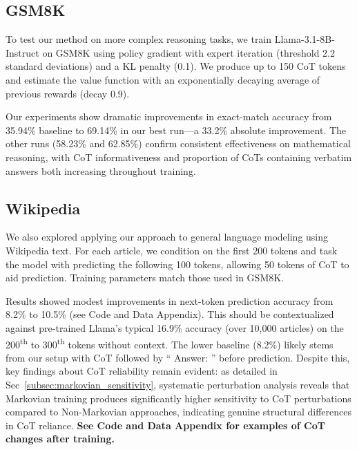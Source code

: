 \documentclass{article} %
\begin{document}
\subsection{GSM8K}
\label{subsec:gsm8k}
To test our method on more complex reasoning tasks, we train Llama-3.1-8B-Instruct on GSM8K using policy gradient with expert iteration (threshold 2.2 standard deviations) and a KL penalty (0.1). We produce up to 150 CoT tokens and estimate the value function with an exponentially decaying average of previous rewards (decay 0.9).

Our experiments show dramatic improvements in exact-match accuracy from 35.94\% baseline to 69.14\% in our best run—a 33.2\% absolute improvement. The other runs (58.23\% and 62.85\%) confirm consistent effectiveness on mathematical reasoning, with CoT informativeness and proportion of CoTs containing verbatim answers both increasing throughout training.

\subsection{Wikipedia}
\label{subsec:wikipedia}

We also explored applying our approach to general language modeling using Wikipedia text. For each article, we condition on the first 200 tokens and task the model with predicting the following 100 tokens, allowing 50 tokens of CoT to aid prediction. Training parameters match those used in GSM8K.

Results showed modest improvements in next-token prediction accuracy from 8.2\% to 10.5\% (see Code and Data Appendix). This should be contextualized against pre-trained Llama's typical 16.9\% accuracy (over 10,000 articles) on the 200\textsuperscript{th} to 300\textsuperscript{th} tokens without context. The lower baseline (8.2\%) likely stems from our setup with CoT followed by `` Answer: '' before prediction. Despite this, key findings about CoT reliability remain evident: as detailed in Sec~\ref{subsec:markovian_sensitivity}, systematic perturbation analysis reveals that Markovian training produces significantly higher sensitivity to CoT perturbations compared to Non-Markovian approaches, indicating genuine structural differences in CoT reliance.
\textbf{See Code and Data Appendix for examples of CoT changes after training.}
\end{document}
